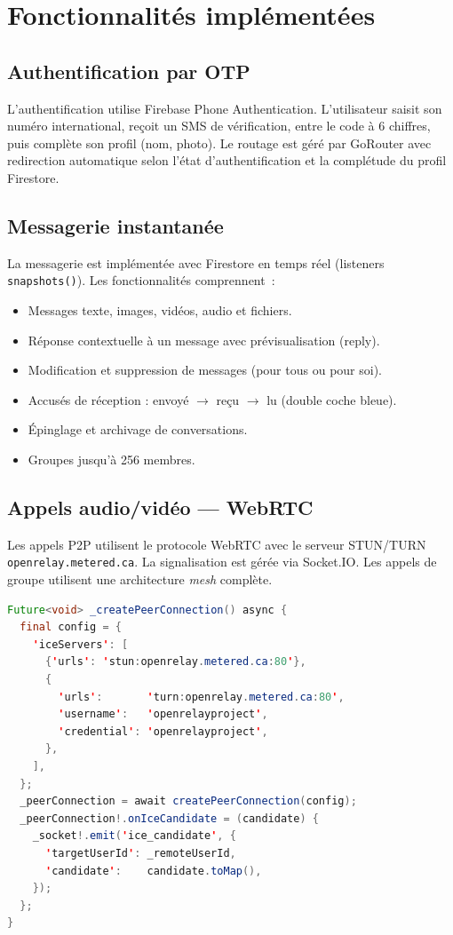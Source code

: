 \documentclass[12pt,a4paper]{report}
\begin{document}
\section{Fonctionnalités implémentées}

\subsection{Authentification par OTP}

L'authentification utilise Firebase Phone Authentication. L'utilisateur saisit son numéro international, reçoit un SMS de vérification, entre le code à 6 chiffres, puis complète son profil (nom, photo). Le routage est géré par GoRouter avec redirection automatique selon l'état d'authentification et la complétude du profil Firestore.

\subsection{Messagerie instantanée}

La messagerie est implémentée avec Firestore en temps réel (listeners \texttt{snapshots()}). Les fonctionnalités comprennent~:
\begin{itemize}
  \item Messages texte, images, vidéos, audio et fichiers.
  \item Réponse contextuelle à un message avec prévisualisation (reply).
  \item Modification et suppression de messages (pour tous ou pour soi).
  \item Accusés de réception : envoyé $\to$ reçu $\to$ lu (double coche bleue).
  \item Épinglage et archivage de conversations.
  \item Groupes jusqu'à 256 membres.
\end{itemize}

\subsection{Appels audio/vidéo --- WebRTC}

Les appels P2P utilisent le protocole WebRTC avec le serveur STUN/TURN        \texttt{openrelay.metered.ca}. La signalisation est gérée via Socket.IO. Les appels de groupe utilisent une architecture \textit{mesh} complète.

\begin{lstlisting}[language=Java,caption={Création de la RTCPeerConnection --- call\_service.dart}]
Future<void> _createPeerConnection() async {
  final config = {
    'iceServers': [
      {'urls': 'stun:openrelay.metered.ca:80'},
      {
        'urls':       'turn:openrelay.metered.ca:80',
        'username':   'openrelayproject',
        'credential': 'openrelayproject',
      },
    ],
  };
  _peerConnection = await createPeerConnection(config);
  _peerConnection!.onIceCandidate = (candidate) {
    _socket!.emit('ice_candidate', {
      'targetUserId': _remoteUserId,
      'candidate':    candidate.toMap(),
    });
  };
}
\end{lstlisting}
\end{document}
